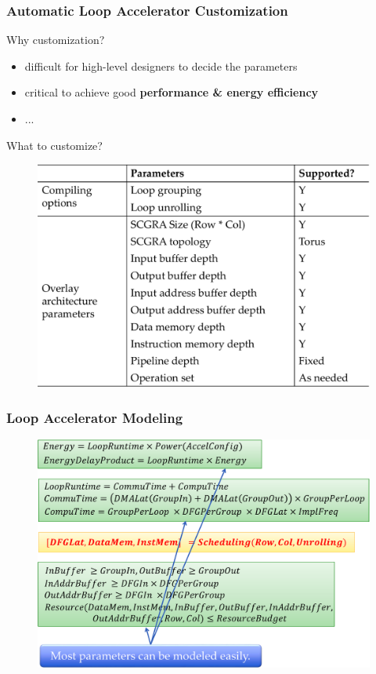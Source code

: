 \documentclass[accentcolor=tud1a,colorbacktitle,inverttitle,landscape,german,presentation,t]{tudbeamer}
\begin{document}
  \begin{frame}
  \frametitle{Automatic Loop Accelerator Customization}
  \vspace{-1em}
  Why customization?
  \begin{itemize}
    \item difficult for high-level designers to decide the parameters
    \item critical to achieve good \textbf{performance \& energy efficiency}
    \item ...
  \end{itemize}

  \vspace{0.1em}
  What to customize?
  \begin{figure}
     \includegraphics[width=.7\linewidth]{custom-para}
  \end{figure}
  \end{frame}

  \begin{frame}
  \frametitle{Loop Accelerator Modeling}
  \vspace{-0.7em}
  \begin{figure}
     \includegraphics[width=.9\linewidth]{custom-model}
  \end{figure}
  \end{frame}
\end{document}
